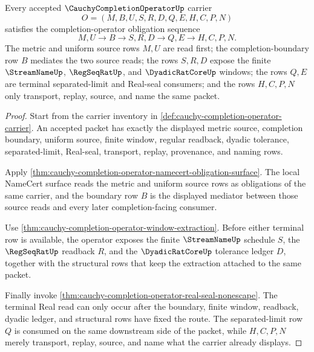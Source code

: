 \begin{theorem}
\label{thm:cauchy-completion-operator-obligation-window-route}
Every accepted $\CauchyCompletionOperatorUp$ carrier
$$
O=(M,B,U,S,R,D,Q,E,H,C,P,N)
$$
satisfies the completion-operator obligation sequence
$$
M,U \longrightarrow B \longrightarrow S,R,D \longrightarrow Q,E \longrightarrow H,C,P,N .
$$
The metric and uniform source rows $M,U$ are read first; the completion-boundary row $B$ mediates the two source reads; the rows $S,R,D$ expose the finite $\StreamNameUp$, $\RegSeqRatUp$, and $\DyadicRatCoreUp$ windows; the rows $Q,E$ are terminal separated-limit and Real-seal consumers; and the rows $H,C,P,N$ only transport, replay, source, and name the same packet.
\end{theorem}
\begin{proof}
Start from the carrier inventory in \autoref{def:cauchy-completion-operator-carrier}. An accepted packet has exactly the displayed metric source, completion boundary, uniform source, finite window, regular readback, dyadic tolerance, separated-limit, Real-seal, transport, replay, provenance, and naming rows.

Apply \autoref{thm:cauchy-completion-operator-namecert-obligation-surface}. The local NameCert surface reads the metric and uniform source rows as obligations of the same carrier, and the boundary row $B$ is the displayed mediator between those source reads and every later completion-facing consumer.

Use \autoref{thm:cauchy-completion-operator-window-extraction}. Before either terminal row is available, the operator exposes the finite $\StreamNameUp$ schedule $S$, the $\RegSeqRatUp$ readback $R$, and the $\DyadicRatCoreUp$ tolerance ledger $D$, together with the structural rows that keep the extraction attached to the same packet.

Finally invoke \autoref{thm:cauchy-completion-operator-real-seal-nonescape}. The terminal Real read can only occur after the boundary, finite window, readback, dyadic ledger, and structural rows have fixed the route. The separated-limit row $Q$ is consumed on the same downstream side of the packet, while $H,C,P,N$ merely transport, replay, source, and name what the carrier already displays.
\end{proof}

